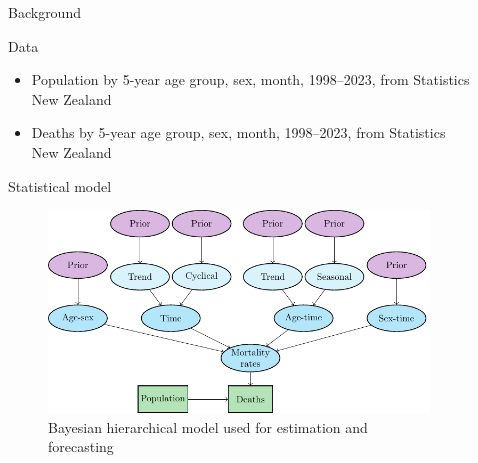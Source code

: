 \documentclass[final]{beamer}
\newlength{\sepwid}
\newlength{\onecolwid}
\newlength{\twocolwid}
\begin{document}
\begin{frame}[t]
\begin{columns}[t]
\begin{column}{\onecolwid}
\begin{block}{Background}
\end{block}


  \begin{block}{Data}

\begin{itemize}
\item Population by 5-year age group, sex, month, 1998--2023, from Statistics New Zealand
\item Deaths by 5-year age group, sex, month, 1998--2023, from Statistics New Zealand
\end{itemize}

\end{block}

\begin{block}{Statistical model}

\begin{figure}
\includegraphics[width = 0.95 \linewidth]{dag.pdf}
\caption{Bayesian hierarchical model used for estimation and forecasting}
\end{figure}

\end{block}


\end{column} %

\begin{column}{\sepwid}\end{column} %

\begin{column}{\twocolwid} %

  \begin{columns}[t,totalwidth=\twocolwid] %

\begin{column}{\onecolwid}\vspace{-.6in} %


\end{column}
\end{columns}
\end{column}
\end{columns}
\end{frame}
\end{document}
